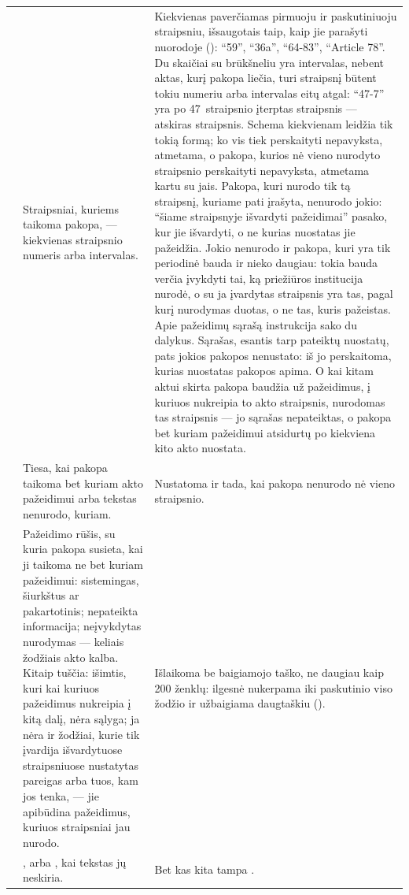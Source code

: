 \begin{xltabular}{\textwidth}{@{}L{27mm}YY@{}}
 & Straipsniai, kuriems taikoma pakopa, --- kiekvienas straipsnio numeris arba intervalas. & Kiekvienas paverčiamas pirmuoju ir paskutiniuoju straipsniu, išsaugotais taip, kaip jie parašyti nuorodoje (): \enquote{59}, \enquote{36a}, \enquote{64-83}, \enquote{Article 78}. Du skaičiai su brūkšneliu yra intervalas, nebent aktas, kurį pakopa liečia, turi straipsnį būtent tokiu numeriu arba intervalas eitų atgal: \enquote{47-7} yra po 47~straipsnio įterptas straipsnis --- atskiras straipsnis. Schema kiekvienam leidžia tik tokią formą; ko vis tiek perskaityti nepavyksta, atmetama, o pakopa, kurios nė vieno nurodyto straipsnio perskaityti nepavyksta, atmetama kartu su jais. Pakopa, kuri nurodo tik tą straipsnį, kuriame pati įrašyta, nenurodo jokio: \enquote{šiame straipsnyje išvardyti pažeidimai} pasako, kur jie išvardyti, o ne kurias nuostatas jie pažeidžia. Jokio nenurodo ir pakopa, kuri yra tik periodinė bauda ir nieko daugiau: tokia bauda verčia įvykdyti tai, ką priežiūros institucija nurodė, o su ja įvardytas straipsnis yra tas, pagal kurį nurodymas duotas, o ne tas, kuris pažeistas. Apie pažeidimų sąrašą instrukcija sako du dalykus. Sąrašas, esantis tarp pateiktų nuostatų, pats jokios pakopos nenustato: iš jo perskaitoma, kurias nuostatas pakopos apima. O kai kitam aktui skirta pakopa baudžia už pažeidimus, į kuriuos nukreipia to akto straipsnis, nurodomas tas straipsnis --- jo sąrašas nepateiktas, o pakopa bet kuriam pažeidimui atsidurtų po kiekviena kito akto nuostata. \\
 & Tiesa, kai pakopa taikoma bet kuriam akto pažeidimui arba tekstas nenurodo, kuriam. & Nustatoma ir tada, kai pakopa nenurodo nė vieno straipsnio. \\
 & Pažeidimo rūšis, su kuria pakopa susieta, kai ji taikoma ne bet kuriam pažeidimui: sistemingas, šiurkštus ar pakartotinis; nepateikta informacija; neįvykdytas nurodymas --- keliais žodžiais akto kalba. Kitaip tuščia: išimtis, kuri kai kuriuos pažeidimus nukreipia į kitą dalį, nėra sąlyga; ja nėra ir žodžiai, kurie tik įvardija išvardytuose straipsniuose nustatytas pareigas arba tuos, kam jos tenka, --- jie apibūdina pažeidimus, kuriuos straipsniai jau nurodo. & Išlaikoma be baigiamojo taško, ne daugiau kaip 200 ženklų: ilgesnė nukerpama iki paskutinio viso žodžio ir užbaigiama daugtaškiu (). \\
 & ,  arba , kai tekstas jų neskiria. & Bet kas kita tampa . \\

\end{xltabular}
